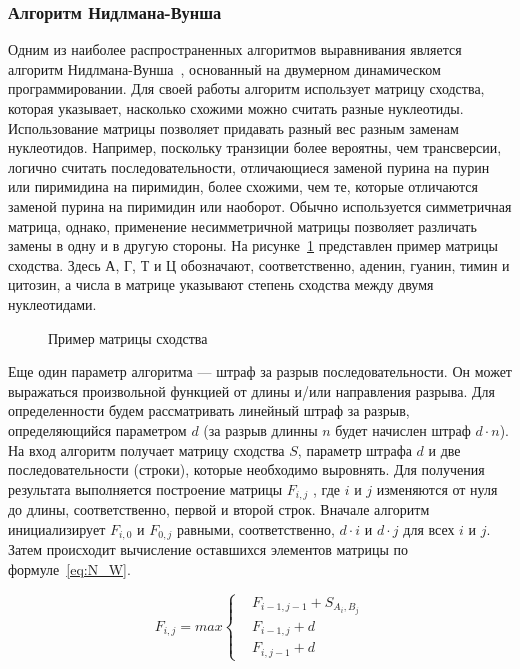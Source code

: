\subsubsection[Алгоритм Нидлмана-Вунша]{\large Алгоритм Нидлмана-Вунша} \label{seq:NW}
\hspace{\parindent} Одним из наиболее распространенных алгоритмов выравнивания является алгоритм Нидлмана-Вунша~\cite{NWalgo}, основанный на двумерном динамическом программировании. Для своей работы алгоритм использует матрицу сходства, которая указывает, насколько схожими можно считать разные нуклеотиды. Использование матрицы позволяет придавать разный вес разным заменам нуклеотидов. Например, поскольку транзиции более вероятны, чем трансверсии, логично считать последовательности, отличающиеся заменой пурина на пурин или пиримидина на пиримидин, более схожими, чем те, которые отличаются заменой пурина на пиримидин или наоборот. Обычно используется симметричная матрица, однако, применение несимметричной матрицы позволяет различать замены в одну и в другую стороны. На рисунке~\ref{ris:ReplaceMatrix} представлен пример матрицы сходства. Здесь А, Г, Т и Ц обозначают, соответственно, аденин, гуанин, тимин и цитозин, а числа в матрице указывают степень сходства между двумя нуклеотидами.

\begin{figure}[h]
	\caption{Пример матрицы сходства}
	\label{ris:ReplaceMatrix}
\end{figure}

\indent Еще один параметр алгоритма --- штраф за разрыв последовательности. Он может выражаться произвольной функцией от длины и/или направления разрыва. Для определенности будем рассматривать линейный штраф за разрыв, определяющийся параметром $d$ (за разрыв длинны $n$ будет начислен штраф $d \cdot n$).\\
\indent На вход алгоритм получает матрицу сходства $S$, параметр штрафа $d$ и две последовательности (строки), которые необходимо выровнять. Для получения результата выполняется построение матрицы $F_{i,j}$ , где $i$ и $j$ изменяются от нуля до длины, соответственно, первой и второй строк. Вначале алгоритм инициализирует $F_{i,0}$ и $F_{0,j}$ равными, соответственно, $d \cdot i$ и $d \cdot j$ для всех $i$ и $j$. Затем происходит вычисление оставшихся элементов матрицы по формуле~\ref{eq:N_W}.

\begin{equation}\label{eq:N_W}
F_{i,j} = max\left\{
	\begin{aligned}
		& F_{i-1,j-1} + S_{A_i,B_j}\\
		& F_{i-1,j} + d\\
		& F_{i,j-1} + d
	\end{aligned}
	\right.
\end{equation}

